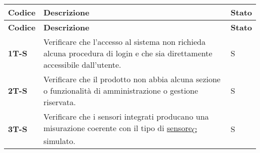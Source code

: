 \begin{longtable}{|>{\raggedright\arraybackslash}m{}|>{\raggedright\arraybackslash}m{}|>{\raggedright\arraybackslash}m{}|}
	\hline
	\textbf{Codice} & \textbf{Descrizione}                                                                                                                                                                                                                                                                                                                                                                                     & \textbf{Stato} \\
	\hline
	\endfirsthead
	\hline
	\textbf{Codice} & \textbf{Descrizione}                                                                                                                                                                                                                                                                                                                                                                                     & \textbf{Stato} \\
	\endhead
	\textbf{1T-S}   & Verificare che l'accesso al sistema non richieda alcuna procedura di login e che sia direttamente accessibile dall'utente.                                                                                                                                                                                                                                                                               & S              \\
	\hline
	\textbf{2T-S}   & Verificare che il prodotto non abbia alcuna sezione o funzionalità di amministrazione o gestione riservata.                                                                                                                                                                                                                                                                                              & S              \\
	\hline
	\textbf{3T-S}   & Verificare che i sensori integrati producano una misurazione coerente con il tipo di \href{https://7last.github.io/docs/pb/documentazione-interna/glossario\#sensore}{sensore\textsubscript{G}} simulato.                                                                                                                                                                                                & S              \\

\end{longtable}
